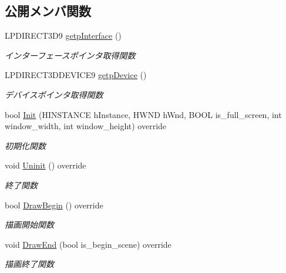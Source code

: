 \subsection*{公開メンバ関数}
\begin{DoxyCompactItemize}
\item 
L\+P\+D\+I\+R\+E\+C\+T3\+D9 \mbox{\hyperlink{class_renderer_direct_x9_aad68389e45dd757dcde19d636f082a21}{getp\+Interface}} ()
\begin{DoxyCompactList}\small\item\em インターフェースポインタ取得関数 \end{DoxyCompactList}\item 
L\+P\+D\+I\+R\+E\+C\+T3\+D\+D\+E\+V\+I\+C\+E9 \mbox{\hyperlink{class_renderer_direct_x9_afabcea127b5af61e4d80564369e72baa}{getp\+Device}} ()
\begin{DoxyCompactList}\small\item\em デバイスポインタ取得関数 \end{DoxyCompactList}\item 
bool \mbox{\hyperlink{class_renderer_direct_x9_af015676b50f3ce1ba7cf20abf6074e3b}{Init}} (H\+I\+N\+S\+T\+A\+N\+CE h\+Instance, H\+W\+ND h\+Wnd, B\+O\+OL is\+\_\+full\+\_\+screen, int window\+\_\+width, int window\+\_\+height) override
\begin{DoxyCompactList}\small\item\em 初期化関数 \end{DoxyCompactList}\item 
void \mbox{\hyperlink{class_renderer_direct_x9_af7ff314cbaa894d71e37c10565002f8f}{Uninit}} () override
\begin{DoxyCompactList}\small\item\em 終了関数 \end{DoxyCompactList}\item 
bool \mbox{\hyperlink{class_renderer_direct_x9_a5113bf4e6aefdb7bcab2016fbbee0174}{Draw\+Begin}} () override
\begin{DoxyCompactList}\small\item\em 描画開始関数 \end{DoxyCompactList}\item 
void \mbox{\hyperlink{class_renderer_direct_x9_a5f934597020f77dc9cf729acfb13a830}{Draw\+End}} (bool is\+\_\+begin\+\_\+scene) override
\begin{DoxyCompactList}\small\item\em 描画終了関数 \end{DoxyCompactList}\item 

\end{DoxyCompactItemize}
